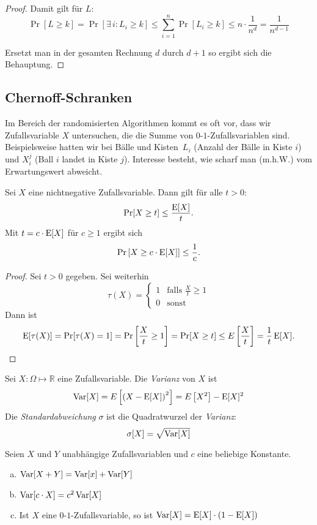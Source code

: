 \begin{proof}
	Damit gilt für $L$:
	\[
	  \Pr[L \geq k] = \Pr\left[ \exists\,i : L_i \geq k \right] \leq
	  \sum_{i=1}^n \Pr[L_i \geq k] \leq n \cdot \frac{1}{n^d} =
	  \frac{1}{n^{d-1}}
	\]

	Ersetzt man in der gesamten Rechnung $d$ durch $d+1$ so ergibt sich die
	Behauptung.
\end{proof}
\subsection{Chernoff-Schranken}
Im Bereich der randomisierten Algorithmen kommt es oft vor, dass wir
Zufallsvariable $X$ untersuchen, die die Summe von $0$-$1$-Zufallsvariablen
sind. Beispielsweise hatten wir bei \glqq Bälle und Kisten\grqq\ $L_i$ (Anzahl
der Bälle in Kiste $i$) und $X_i^j$ (Ball $i$ landet in Kiste $j$). Interesse
besteht, wie scharf man (m.h.W.) vom Erwartungswert abweicht.
\begin{satz}
	Sei $X$ eine nichtnegative Zufallsvariable. Dann gilt für alle $t > 0$:
	\[
	  \Pr[X \geq t] \leq \frac{\operatorname{E}[X]}{t}.
	\]
	Mit $t = c \cdot \operatorname{E}[X]$ für $c \geq 1$ ergibt sich
	\[
	  \Pr\left[X \geq c \cdot \operatorname{E}[X]\right] \leq \frac{1}{c}.
	\]
\end{satz}
\begin{proof}
	Sei $t > 0$ gegeben. Sei weiterhin 
	\[
	  \tau(X) = \begin{cases} 1 & \text{falls } \frac{X}{t} \geq 1 \\ 0 &
		  \text{sonst} \end{cases}
	\]
	Dann ist
	\[
	  \operatorname{E}[\tau(X)] = \Pr[\tau(X)=1] = \Pr\left[\frac{X}{t} \geq 1\right] = \Pr[X
	  \geq t] \leq E\left[\frac{X}{t}\right] = \frac{1}{t} \operatorname{E}[X].
	\]
\end{proof}
\begin{defn}
	Sei $X : \Omega \mapsto \mathbb{R}$ eine Zufallsvariable. Die \emph{Varianz} von $X$ ist
	\[
	  \operatorname{Var}[X] = E\left[\left(X - \operatorname{E}[X]\right)^2 \right] = E\left[X^2\right] - \operatorname{E}[X]^2
	\]
	Die \emph{Standardabweichung} $\sigma$ ist die Quadratwurzel der \emph{Varianz}:
	\[
	  \sigma[X] = \sqrt{\operatorname{Var}[X]}
	\]
\end{defn}
\begin{satz}
	Seien $X$ und $Y$ unabhängige Zufallsvariablen und $c$ eine beliebige Konstante.
	\begin{enumerate}[(a)]
		\item $\operatorname{Var}[X+Y] = \operatorname{Var}[x] + \operatorname{Var}[Y]$
		\item $\operatorname{Var}[c\cdot X] = c^2 \operatorname{Var}[X]$
		\item Ist $X$ eine $0$-$1$-Zufallsvariable, so ist $\operatorname{Var}[X] =
			\operatorname{E}[X] \cdot \left(1 - \operatorname{E}[X]\right)$
	\end{enumerate}
\end{satz}
